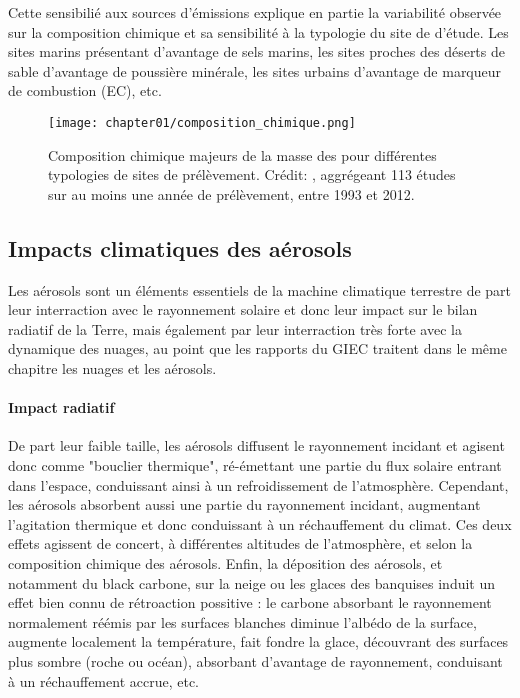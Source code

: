 Cette sensibilié aux sources d'émissions explique en partie la variabilité observée sur
la composition chimique et sa sensibilité à la typologie du site de d'étude. Les sites
marins présentant d'avantage de sels marins, les sites proches des déserts de sable
d'avantage de poussière minérale, les sites urbains d'avantage de marqueur de combustion
(EC), etc.

\begin{figure}[htpb]
    \centering
    \texttt{[image: chapter01/composition\_chimique.png]}
    \caption{Composition chimique majeurs de la masse des \PMdix{} pour différentes
        typologies de sites de prélèvement. Crédit: \cite[figure 7.13]{boucherClouds2013},
        aggrégeant 113 études sur au moins une année de prélèvement, entre 1993 et 2012.}%
    \label{fig:chapter01/composition_chimique}
\end{figure}

\subsection{Impacts climatiques des aérosols}%
\label{sub:impacts_climatiques_des_aerosols}

Les aérosols sont un éléments essentiels de la machine climatique terrestre de part leur
interraction avec le rayonnement solaire et donc leur impact sur le bilan radiatif de la
Terre, mais également par leur interraction très forte avec la dynamique des nuages, au
point que les rapports du GIEC traitent dans le même chapitre les nuages et les aérosols.

\paragraph{Impact radiatif}%
\label{par:impact_radiatif}

De part leur faible taille, les aérosols diffusent le rayonnement incidant et agisent donc
comme "bouclier thermique", ré-émettant une partie du flux solaire entrant dans l'espace,
conduissant ainsi à un refroidissement de l'atmosphère.
Cependant, les aérosols absorbent aussi une partie du rayonnement incidant, augmentant
l'agitation thermique et donc conduissant à un réchauffement du climat.
Ces deux effets agissent de concert, à différentes altitudes de l'atmosphère, et selon la
composition chimique des aérosols.
Enfin, la déposition des aérosols, et notamment du black carbone, sur la neige ou les
glaces des banquises induit un effet bien connu de rétroaction possitive : le carbone
absorbant le rayonnement normalement réémis par les surfaces blanches diminue l'albédo de
la surface, augmente localement la température, fait fondre la glace, découvrant des
surfaces plus sombre (roche ou océan), absorbant d'avantage de rayonnement, conduisant à
un réchauffement accrue, etc.


